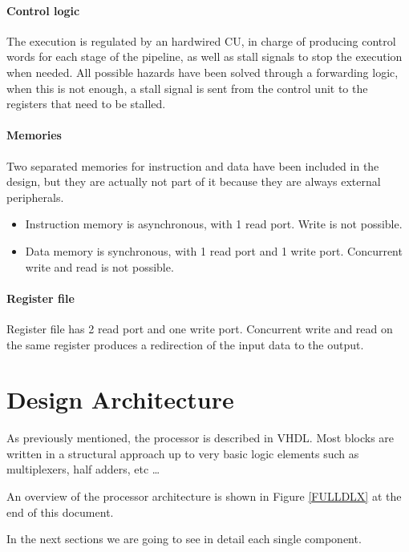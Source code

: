 \documentclass[12pt]{article}
\begin{document}
\paragraph{Control logic}
The execution is regulated by an hardwired CU, in charge of producing control words for each stage of the pipeline, as well as stall signals to stop the execution when needed.
All possible hazards have been solved through a forwarding logic, when this is not enough, a stall signal is sent from the control unit to the registers that need to be stalled.

\paragraph{Memories}
Two separated memories for instruction and data have been included in the design, but they are actually not part of it because they are always external peripherals.
\begin{itemize}
\item Instruction memory is asynchronous, with 1 read port. Write is not possible.
\item Data memory is synchronous, with 1 read port and 1 write port. Concurrent write and read is not possible.
\end{itemize}

\paragraph{Register file}
Register file has 2 read port and one write port. Concurrent write and read on the same register produces a redirection of the input data to the output.

\section{Design Architecture}\label{Design}
As previously mentioned, the processor is described in VHDL. Most blocks are written in a structural approach up to very basic logic elements such as multiplexers, half adders, etc \ldots

An overview of the processor architecture is shown in Figure \ref{FULLDLX} at the end of this document.

In the next sections we are going to see in detail each single component.
\end{document}

